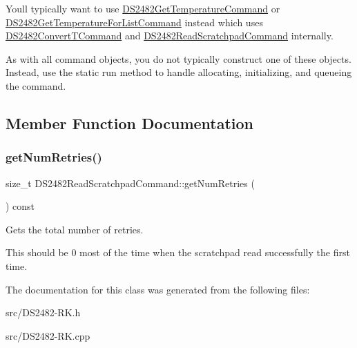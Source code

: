 You\textquotesingle{}ll typically want to use \mbox{\hyperlink{class_d_s2482_get_temperature_command}{D\+S2482\+Get\+Temperature\+Command}} or \mbox{\hyperlink{class_d_s2482_get_temperature_for_list_command}{D\+S2482\+Get\+Temperature\+For\+List\+Command}} instead which uses \mbox{\hyperlink{class_d_s2482_convert_t_command}{D\+S2482\+Convert\+T\+Command}} and \mbox{\hyperlink{class_d_s2482_read_scratchpad_command}{D\+S2482\+Read\+Scratchpad\+Command}} internally.

As with all command objects, you do not typically construct one of these objects. Instead, use the static run method to handle allocating, initializing, and queueing the command. 

\subsection{Member Function Documentation}
\mbox{\label{class_d_s2482_read_scratchpad_command_a41ec4653739bf4d13351a25800fedb91}} 
\subsubsection{\texorpdfstring{get\+Num\+Retries()}{getNumRetries()}}
{\footnotesize\ttfamily size\+\_\+t D\+S2482\+Read\+Scratchpad\+Command\+::get\+Num\+Retries (\begin{DoxyParamCaption}{ }\end{DoxyParamCaption}) const\hspace{0.3cm}{\ttfamily [inline]}}



Gets the total number of retries. 

This should be 0 most of the time when the scratchpad read successfully the first time. 

The documentation for this class was generated from the following files\+:\begin{DoxyCompactItemize}
\item 
src/D\+S2482-\/\+R\+K.\+h\item 
src/D\+S2482-\/\+R\+K.\+cpp\end{DoxyCompactItemize}

